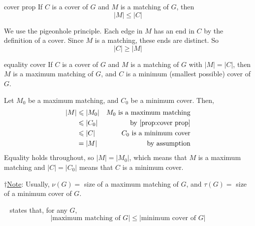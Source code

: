 \begin{Proposition}{}{cover prop}
    If $ C $ is a cover of $ G $ and $ M $ is a matching of $ G $, then
    \[ |M|\leqslant |C| \]
\end{Proposition}

\begin{Proof}{}{}
    We use the pigeonhole principle. Each edge in $ M $ has an end in $ C $ by the definition
    of a cover. Since $ M $ is a matching, these ends are distinct. So
    \[ |C|\geqslant |M| \]
\end{Proof}


\begin{Proposition}{}{equality cover}
    If $ C $ is a cover of $ G $ and $ M $ is a matching of $ G $ with $ |M|=|C| $,
    then $ M $ is a maximum matching of $ G $, and $ C $ is a minimum (smallest possible)
    cover of $ G $.
\end{Proposition}

\begin{Proof}{}{}
    Let $ M_0 $ be a maximum matching, and $ C_0 $ be a minimum cover. Then,
    \begin{equation}
        \begin{aligned}
            |M| & \leqslant |M_0| & M_0\text{ is a maximum matching} \\
                & \leqslant |C_0| & \text{by~\Cref{prop:cover prop}} \\
                & \leqslant |C|   & C_0 \text{ is a minimum cover}   \\
                & =|M|            & \text{by assumption}
        \end{aligned}
    \end{equation}
    Equality holds throughout, so $ |M|=|M_0| $, which means that $ M $ is a maximum
    matching and $ |C|=|C_0| $ means that $ C $ is a minimum cover.
\end{Proof}
$ \dagger $\underline{Note}: Usually, $ \nu(G) = $ size of a maximum matching of $ G $,
and $ \tau(G) = $ size of a minimum cover of $ G $.

~ states that, for any $ G $,
\[ |\text{maximum matching of }G|\leqslant |\text{minimum cover of }G| \]

